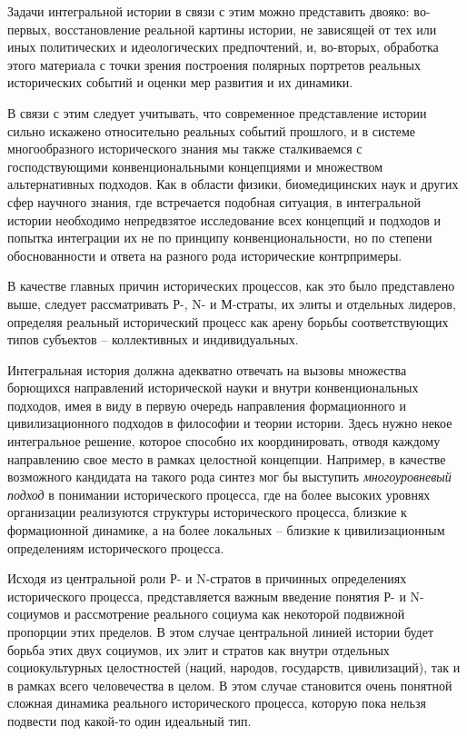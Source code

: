     Задачи интегральной истории в связи с этим можно представить двояко: во-первых, восстановление реальной картины истории, не зависящей от тех или иных политических и идеологических предпочтений, и, во-вторых, обработка этого материала с точки зрения построения полярных портретов реальных исторических событий и оценки мер развития и их динамики.

    В связи с этим следует учитывать, что современное представление истории сильно искажено относительно реальных событий прошлого, и в системе многообразного исторического знания мы также сталкиваемся с господствующими конвенциональными концепциями и множеством альтернативных подходов. Как в области физики, биомедицинских наук и других сфер научного знания, где встречается подобная ситуация, в интегральной истории необходимо непредвзятое исследование всех концепций и подходов и попытка интеграции их не по принципу конвенциональности, но по степени обоснованности и ответа на разного рода исторические контрпримеры.

    В качестве главных причин исторических процессов, как это было представлено выше, следует рассматривать Р-, N- и М-страты, их элиты и отдельных лидеров, определяя реальный исторический процесс как арену борьбы соответствующих типов субъектов – коллективных и индивидуальных.

    Интегральная история должна адекватно отвечать на вызовы множества борющихся направлений исторической науки и внутри конвенциональных подходов, имея в виду в первую очередь направления формационного и цивилизационного подходов в философии и теории истории. Здесь нужно некое интегральное решение, которое способно их координировать, отводя каждому направлению свое место в рамках целостной концепции. Например, в качестве возможного кандидата на такого рода синтез мог бы выступить \textit{многоуровневый подход} в понимании исторического процесса, где на более высоких уровнях организации реализуются структуры исторического процесса, близкие к формационной динамике, а на более локальных – близкие к цивилизационным определениям исторического процесса.

    Исходя из центральной роли Р- и N-стратов в причинных определениях исторического процесса, представляется важным введение понятия Р- и N-социумов и рассмотрение реального социума как некоторой подвижной пропорции этих пределов. В этом случае центральной линией истории будет борьба этих двух социумов, их элит и стратов как внутри отдельных социокультурных целостностей (наций, народов, государств, цивилизаций), так и в рамках всего человечества в целом. В этом случае становится очень понятной сложная динамика реального исторического процесса, которую пока нельзя подвести под какой-то один идеальный тип.

